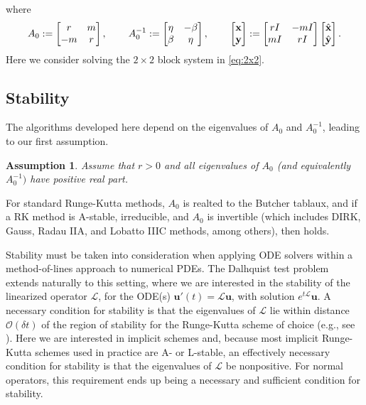 \documentclass[a4paper,10pt]{article}
\newtheorem{assumption}{Assumption}
\begin{document}
%
where
%
\begin{align*}
A_0 := \begin{bmatrix} r & m\\ -m & r\end{bmatrix}, \hspace{5ex}
A_0^{-1} := \begin{bmatrix} \eta & -\beta \\ \beta & \eta\end{bmatrix},
\hspace{5ex}
\begin{bmatrix} \mathbf{x}\\\mathbf{y}\end{bmatrix} := 
	\begin{bmatrix} r I & -m I \\ m I & r I\end{bmatrix}
	\begin{bmatrix} \hat{\mathbf{x}}\\\hat{\mathbf{y}}\end{bmatrix}.
\end{align*}
%
Here we consider solving the $2\times 2$ block system in \eqref{eq:2x2}.

\subsection{Stability}

The algorithms developed here depend on the eigenvalues of $A_0$ and
$A_0^{-1}$, leading to our first assumption.
%
\begin{assumption}\label{ass:eig}
Assume that $r > 0$ and all eigenvalues of $A_0$ (and equivalently $A_0^{-1})$
have positive real part.
\end{assumption}
%
For standard Runge-Kutta methods, $A_0$ is realted to the Butcher tablaux, and
if a RK method is A-stable, irreducible, and $A_0$ is invertible (which includes DIRK,
Gauss, Radau IIA, and Lobatto IIIC methods, among others), then  holds.

Stability must be taken into consideration when applying ODE solvers within a
method-of-lines approach to numerical PDEs. The Dalhquist test problem extends
naturally to this setting, where we are interested in the stability of the
linearized operator $\mathcal{L}$, for the ODE(s)
$\mathbf{u}'(t) = \mathcal{L}\mathbf{u}$, with solution $e^{t\mathcal{L}}\mathbf{u}$.
A necessary condition for stability is that the eigenvalues of $\mathcal{L}$
lie within distance $\mathcal{O}(\delta t)$ of the region of stability for
the Runge-Kutta scheme of choice (e.g., see \cite{reddy92}). Here we are
interested in implicit schemes and, because most implicit Runge-Kutta schemes
used in practice are A- or L-stable, an effectively necessary condition for
stability is that the eigenvalues of $\mathcal{L}$ be nonpositive. For
normal operators, this requirement ends up being a necessary and sufficient
condition for stability.
\end{document}
